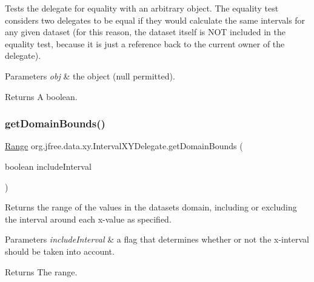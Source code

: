Tests the delegate for equality with an arbitrary object. The equality test considers two delegates to be equal if they would calculate the same intervals for any given dataset (for this reason, the dataset itself is N\+OT included in the equality test, because it is just a reference back to the current \textquotesingle{}owner\textquotesingle{} of the delegate).


\begin{DoxyParams}{Parameters}
{\em obj} & the object ({\ttfamily null} permitted).\\
\hline
\end{DoxyParams}
\begin{DoxyReturn}{Returns}
A boolean. 
\end{DoxyReturn}
\mbox{\label{classorg_1_1jfree_1_1data_1_1xy_1_1_interval_x_y_delegate_a4b2d8f90fd92fc9108f9556c02b0febd}} 
\subsubsection{\texorpdfstring{get\+Domain\+Bounds()}{getDomainBounds()}}
{\footnotesize\ttfamily \mbox{\hyperlink{classorg_1_1jfree_1_1data_1_1_range}{Range}} org.\+jfree.\+data.\+xy.\+Interval\+X\+Y\+Delegate.\+get\+Domain\+Bounds (\begin{DoxyParamCaption}\item[{boolean}]{include\+Interval }\end{DoxyParamCaption})}

Returns the range of the values in the dataset\textquotesingle{}s domain, including or excluding the interval around each x-\/value as specified.


\begin{DoxyParams}{Parameters}
{\em include\+Interval} & a flag that determines whether or not the x-\/interval should be taken into account.\\
\hline
\end{DoxyParams}
\begin{DoxyReturn}{Returns}
The range. 
\end{DoxyReturn}


